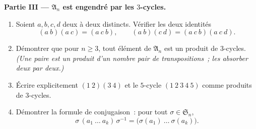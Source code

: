 \begin{problem}
\medskip
\noindent\textbf{Partie III --- $\mathfrak A_n$ est engendré par les
$3$-cycles.}
\begin{enumerate}[resume]
  \item Soient $a, b, c, d$ deux à deux distincts. Vérifier les deux
        identités
        \[
        (a\ b)(a\ c) = (a\ c\ b),
        \qquad
        (a\ b)(c\ d) = (a\ c\ b)(a\ c\ d) .
        \]
  \item Démontrer que pour $n \geq 3$, tout élément de $\mathfrak
        A_n$ est un produit de $3$-cycles. \emph{(Une 
        paire est un produit d'un nombre pair de transpositions~;
        les absorber deux par deux.)}
  \item Écrire explicitement $(1\ 2)(3\ 4)$ et le $5$-cycle
        $(1\ 2\ 3\ 4\ 5)$ comme produits de $3$-cycles.
  \item Démontrer la formule de conjugaison~: pour tout $\sigma \in
        \mathfrak S_n$,
        \[
        \sigma\,(a_1\ \dots\ a_k)\,\sigma^{-1}
        = \bigl(\sigma(a_1)\ \dots\ \sigma(a_k)\bigr) .
        \]
\end{enumerate}


\end{problem}
